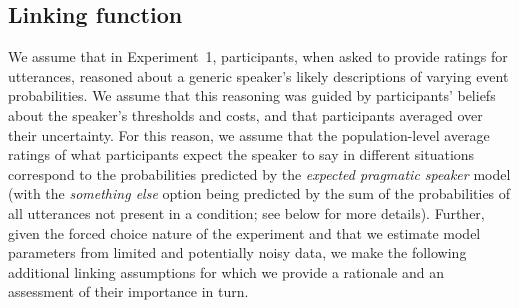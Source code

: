 \subsection{Linking function}

We assume that in Experiment~1, participants, when asked to provide ratings for utterances, reasoned about a generic speaker's 
likely descriptions of varying event probabilities. 
We assume that this reasoning was guided by participants' beliefs about the speaker's thresholds and costs, and 
that participants averaged over their uncertainty. For this reason, we assume that the population-level 
average ratings of what participants expect the speaker to say in different situations 
correspond to the probabilities predicted by the \textit{expected pragmatic speaker} model (with the \textit{something else}
option being predicted by the sum of the probabilities of all utterances not present in a condition; see below for more details).
Further, given the forced choice nature of the experiment and that we estimate model 
parameters from limited and potentially noisy data, we make the following additional linking assumptions
for which we provide a rationale and an assessment of their importance in turn.

